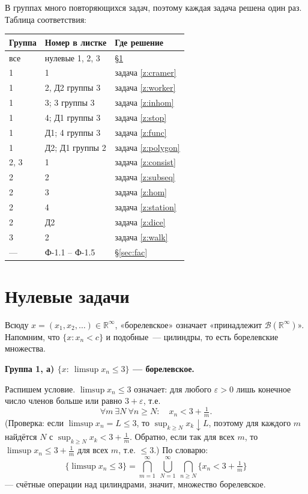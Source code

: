 \documentclass[11pt,a4paper]{article}
\theoremstyle{definition}
\newcommand{\R}{\mathbb R}
\newcommand{\B}{\mathcal B}
\newcommand{\1}{\mathbf 1}
\newenvironment{task}[1]{\par\medskip\noindent\colorbox{black!7}{\parbox{\dimexpr\linewidth-2\fboxsep}{\textbf{#1}}}\par\smallskip}{\par}
\begin{document}
В группах много повторяющихся задач, поэтому каждая задача решена один раз.
Таблица соответствия:

\begin{center}
\begin{tabular}{lll}
\toprule
Группа & Номер в листке & Где решение \\
\midrule
все & нулевые 1, 2, 3 & \S\ref{sec:zero} \\
1 & 1 & задача \ref{z:cramer} \\
1 & 2, Д2 группы 3 & задача \ref{z:worker} \\
1 & 3; 3 группы 3 & задача \ref{z:inhom} \\
1 & 4; Д1 группы 3 & задача \ref{z:stop} \\
1 & Д1; 4 группы 3 & задача \ref{z:func} \\
1 & Д2; Д1 группы 2 & задача \ref{z:polygon} \\
2, 3 & 1 & задача \ref{z:consist} \\
2 & 2 & задача \ref{z:subseq} \\
2 & 3 & задача \ref{z:hom} \\
2 & 4 & задача \ref{z:station} \\
2 & Д2 & задача \ref{z:dice} \\
3 & 2 & задача \ref{z:walk} \\
--- & Ф-1.1 -- Ф-1.5 & \S\ref{sec:fac} \\
\bottomrule
\end{tabular}
\end{center}

\section{Нулевые задачи}\label{sec:zero}

Всюду $x=(x_1,x_2,\dots)\in\R^\infty$, «борелевское» означает
«принадлежит $\B(\R^\infty)$». Напомним, что $\{x:x_n<c\}$ и подобные~---
цилиндры, то есть борелевские множества.

\begin{task}{Группа 1, а) $\{x:\ \limsup x_n\le3\}$ --- борелевское.}
\end{task}
Распишем условие. $\limsup x_n\le3$ означает: для любого $\varepsilon>0$ лишь
конечное число членов больше или равно $3+\varepsilon$, т.е.
\[
\forall m\ \exists N\ \forall n\ge N:\quad x_n<3+\tfrac1m .
\]
(Проверка: если $\limsup x_n=L\le3$, то $\sup_{k\ge N}x_k\downarrow L$, поэтому
для каждого $m$ найдётся $N$ с $\sup_{k\ge N}x_k<3+\frac1m$. Обратно, если так
для всех $m$, то $\limsup x_n\le3+\frac1m$ для всех $m$, т.е. $\le3$.)
По словарю:
\[
\{\limsup x_n\le3\}=\bigcap_{m=1}^\infty\ \bigcup_{N=1}^\infty\ \bigcap_{n\ge N}\{x_n<3+\tfrac1m\}
\]
--- счётные операции над цилиндрами, значит, множество борелевское.
\end{document}
